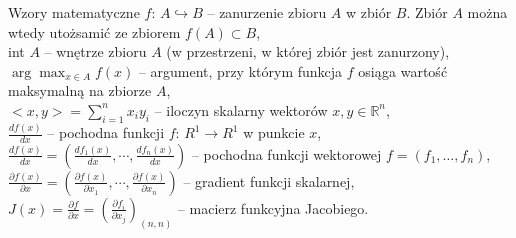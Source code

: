 \documentclass[a4paper, 11pt]{beamer}
\begin{document}
  \begin{frame}{Wzory matematyczne}{}
    {\color{blue}$f: \, A \hookrightarrow B$} -- zanurzenie zbioru $A$ w zbiór $B$. Zbiór $A$
    można wtedy utożsamić ze zbiorem $f(A) \subset B$,\\

    {\color{blue}int $A$} -- wnętrze zbioru $A$ (w przestrzeni, w której zbiór
    jest zanurzony),\\

    {\color{blue}$\arg \max_{x \in A} f(x)$} -- argument, przy którym funkcja
    $f$ osiąga wartość maksymalną na zbiorze $A$,\\

    {\color{blue}$<x, y> = \sum_{i=1}^n x_i y_i$} -- iloczyn skalarny wektorów
    $x, y \in \mathbb{R}^n$,\\

    {\color{blue}$\frac{df(x)}{dx}$} -- pochodna funkcji $f: \, R^1 \to R^1$ w
    punkcie $x$,\\

    {\color{blue}$\frac{df(x)}{dx}=\left( \frac{df_1(x)}{dx}, \cdots ,
    \frac{df_n(x)}{dx}\right )$} -- pochodna funkcji wektorowej $f=(f_1, \ldots
    , f_n)$,\\
    
    {\color{blue}$\frac{\partial f(x)}{\partial x}=\left( \frac{\partial f(x)}{\partial
    x_1}, \cdots , \frac{\partial f(x)}{\partial x_n} \right )$} -- gradient
    funkcji skalarnej,\\
    
    {\color{blue}$J(x) = \frac{\partial f}{\partial x} = \left( \frac{\partial
    f_i}{\partial x_j}\right)_{(n, n)}$} -- macierz funkcyjna
    Jacobiego.

  \end{frame}
\end{document}
